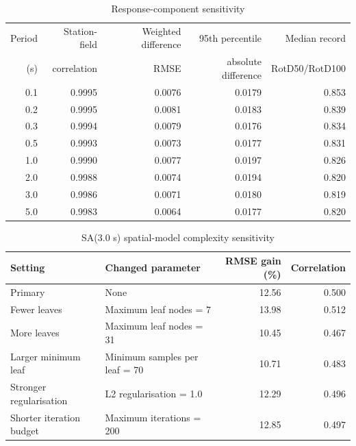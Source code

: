 \documentclass[10pt]{article}
\begin{document}
\begin{table}[H]
\centering
\caption{Response-component sensitivity}
\small
\begin{tabular}{rrrrr}
\toprule
Period & Station-field & Weighted difference & 95th percentile & Median record \\
(s) & correlation & RMSE & absolute difference & RotD50/RotD100 \\
\midrule
0.1 & 0.9995 & 0.0076 & 0.0179 & 0.853 \\
0.2 & 0.9995 & 0.0081 & 0.0183 & 0.839 \\
0.3 & 0.9994 & 0.0079 & 0.0176 & 0.834 \\
0.5 & 0.9993 & 0.0073 & 0.0177 & 0.831 \\
1.0 & 0.9990 & 0.0077 & 0.0197 & 0.826 \\
2.0 & 0.9988 & 0.0074 & 0.0194 & 0.820 \\
3.0 & 0.9986 & 0.0071 & 0.0180 & 0.819 \\
5.0 & 0.9983 & 0.0064 & 0.0177 & 0.820 \\
\bottomrule
\end{tabular}
\end{table}

\begin{table}[H]
\centering
\caption{SA(3.0 s) spatial-model complexity sensitivity}
\small
\begin{tabular}{llrr}
\toprule
Setting & Changed parameter & RMSE gain (\%) & Correlation \\
\midrule
Primary & None & 12.56 & 0.500 \\
Fewer leaves & Maximum leaf nodes = 7 & 13.98 & 0.512 \\
More leaves & Maximum leaf nodes = 31 & 10.45 & 0.467 \\
Larger minimum leaf & Minimum samples per leaf = 70 & 10.71 & 0.483 \\
Stronger regularisation & L2 regularisation = 1.0 & 12.29 & 0.496 \\
Shorter iteration budget & Maximum iterations = 200 & 12.85 & 0.497 \\
\bottomrule
\end{tabular}
\end{table}
\end{document}
